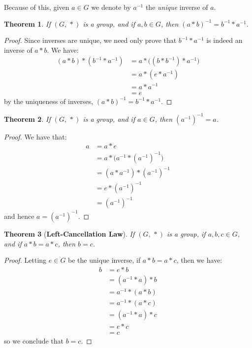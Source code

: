 \documentclass{article}
\theoremstyle{plain}
\newtheorem{theorem}{Theorem}[section]
\theoremstyle{normal}
\begin{document}
        Because of this, given $a\in{G}$ we denote by $a^{-1}$ the
        \textit{unique} inverse of $a$.
        \begin{theorem}
            If $(G,\,*)$ is a group, and if $a,b\in{G}$, then
            $(a*b)^{-1}=b^{-1}*a^{-1}$.
        \end{theorem}
        \begin{proof}
            Since inverses are unique, we need only prove that
            $b^{-1}*a^{-1}$ is indeed an inverse of $a*b$. We have:
            \begin{align}
                (a*b)*(b^{-1}*a^{-1})&=
                    a*\big((b*b^{-1})*a^{-1}\big)\tag{Associativity}\\
                    &=a*(e*a^{-1})\tag{Inverse}\\
                    &=a*a^{-1}\tag{Identity}\\
                    &=e\tag{Inverse}
            \end{align}
            by the uniqueness of inverses, $(a*b)^{-1}=b^{-1}*a^{-1}$.
        \end{proof}
        \begin{theorem}
            If $(G,\,*)$ is a group, and if $a\in{G}$, then
            $(a^{-1})^{-1}=a$.
        \end{theorem}
        \begin{proof}
            We have that:
            \begin{align}
                a&=a*e\tag{Identity}\\
                &=a*\big(a^{-1}*(a^{-1})^{-1}\big)\tag{Inverse}\\
                &=(a*a^{-1})*(a^{-1})^{-1}\tag{Associativity}\\
                &=e*(a^{-1})^{-1}\tag{Inverse}\\
                &=(a^{-1})^{-1}\tag{Identity}
            \end{align}
            and hence $a=(a^{-1})^{-1}$.
        \end{proof}
        \begin{theorem}[\textbf{Left-Cancellation Law}]
            If $(G,\,*)$ is a group, if $a,b,c\in{G}$, and if
            $a*b=a*c$, then $b=c$.
        \end{theorem}
        \begin{proof}
            Letting $e\in{G}$ be the unique inverse, if $a*b=a*c$, then we have:
            \begin{align}
                b&=e*b\tag{Identity}\\
                &=(a^{-1}*a)*b\tag{Inverse}\\
                &=a^{-1}*(a*b)\tag{Associativity}\\
                &=a^{-1}*(a*c)\tag{Hypothesis}\\
                &=(a^{-1}*a)*c\tag{Associativity}\\
                &=e*c\tag{Inverse}\\
                &=c\tag{Identity}
            \end{align}
            so we conclude that $b=c$.
        \end{proof}
\end{document}
